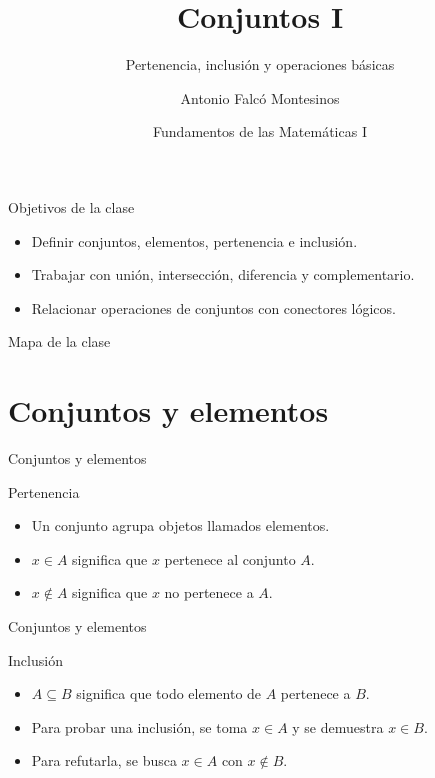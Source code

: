 \documentclass[aspectratio=169,11pt]{beamer}
\title[FdM I -- Clase 06]{Conjuntos I}
\subtitle{Pertenencia, inclusión y operaciones básicas}
\author{Antonio Falcó Montesinos}
\institute{Universidad CEU Cardenal Herrera}
\date{Fundamentos de las Matemáticas I}
\begin{document}
\begin{frame}
  \titlepage
\end{frame}

\begin{frame}{Objetivos de la clase}
\begin{itemize}
  \item Definir conjuntos, elementos, pertenencia e inclusión.
  \item Trabajar con unión, intersección, diferencia y complementario.
  \item Relacionar operaciones de conjuntos con conectores lógicos.
\end{itemize}
\end{frame}

\begin{frame}{Mapa de la clase}
\tableofcontents
\end{frame}

\section{Conjuntos y elementos}

\begin{frame}{Conjuntos y elementos}
\begin{block}{Pertenencia}
\begin{itemize}
  \item Un conjunto agrupa objetos llamados elementos.
  \item \(x\in A\) significa que \(x\) pertenece al conjunto \(A\).
  \item \(x\notin A\) significa que \(x\) no pertenece a \(A\).
\end{itemize}
\end{block}
\end{frame}

\begin{frame}{Conjuntos y elementos}
\begin{block}{Inclusión}
\begin{itemize}
  \item \(A\subseteq B\) significa que todo elemento de \(A\) pertenece a \(B\).
  \item Para probar una inclusión, se toma \(x\in A\) y se demuestra \(x\in B\).
  \item Para refutarla, se busca \(x\in A\) con \(x\notin B\).
\end{itemize}
\end{block}
\end{frame}
\end{document}
